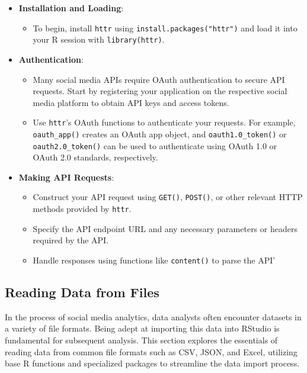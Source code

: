\documentclass[
]{book}
\providecommand{\tightlist}{%
  \setlength{\itemsep}{0pt}\setlength{\parskip}{0pt}}
\begin{document}
\begin{itemize}
\tightlist
\item
  \textbf{Installation and Loading}:

  \begin{itemize}
  \tightlist
  \item
    To begin, install \texttt{httr} using \texttt{install.packages("httr")} and load it into your R session with \texttt{library(httr)}.
  \end{itemize}
\item
  \textbf{Authentication}:

  \begin{itemize}
  \tightlist
  \item
    Many social media APIs require OAuth authentication to secure API requests. Start by registering your application on the respective social media platform to obtain API keys and access tokens.
  \item
    Use \texttt{httr}'s OAuth functions to authenticate your requests. For example, \texttt{oauth\_app()} creates an OAuth app object, and \texttt{oauth1.0\_token()} or \texttt{oauth2.0\_token()} can be used to authenticate using OAuth 1.0 or OAuth 2.0 standards, respectively.
  \end{itemize}
\item
  \textbf{Making API Requests}:

  \begin{itemize}
  \tightlist
  \item
    Construct your API request using \texttt{GET()}, \texttt{POST()}, or other relevant HTTP methods provided by \texttt{httr}.
  \item
    Specify the API endpoint URL and any necessary parameters or headers required by the API.
  \item
    Handle responses using functions like \texttt{content()} to parse the API'
  \end{itemize}
\end{itemize}

\hypertarget{reading-data-from-files}{%
\subsection{Reading Data from Files}\label{reading-data-from-files}}

In the process of social media analytics, data analysts often encounter datasets in a variety of file formats. Being adept at importing this data into RStudio is fundamental for subsequent analysis. This section explores the essentials of reading data from common file formats such as CSV, JSON, and Excel, utilizing base R functions and specialized packages to streamline the data import process.
\end{document}
